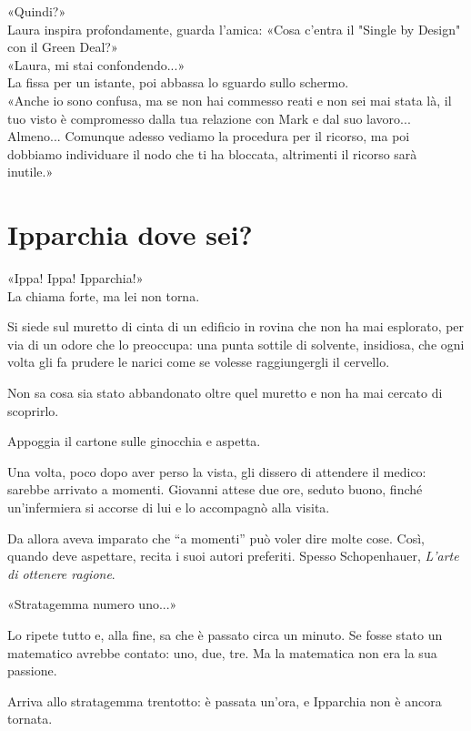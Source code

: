 \documentclass[10pt,oneside]{extbook}
\begin{document}
«Quindi?»\\
Laura inspira profondamente, guarda l'amica:
«Cosa c'entra il "Single by Design" con il Green Deal?»\\
«Laura, mi stai confondendo...»\\

La fissa per un istante, poi abbassa lo sguardo sullo schermo.\\

«Anche io sono confusa, ma se non hai commesso reati e non sei mai stata l\`a, il tuo visto \`e compromesso dalla tua relazione con Mark e dal suo lavoro... Almeno... Comunque adesso vediamo la procedura per il ricorso, ma poi dobbiamo individuare il nodo che ti ha bloccata, altrimenti il ricorso sarà inutile.»

\clearpage{}
\clearpage{}\chapter{Ipparchia dove sei?}

«Ippa! Ippa! Ipparchia!»\\
La chiama forte, ma lei non torna.

Si siede sul muretto di cinta di un edificio in rovina che non ha mai esplorato, per via di un odore che lo preoccupa: una punta sottile di solvente, insidiosa, che ogni volta gli fa prudere le narici come se volesse raggiungergli il cervello.

Non sa cosa sia stato abbandonato oltre quel muretto e non ha mai cercato di scoprirlo.

Appoggia il cartone sulle ginocchia e aspetta.

Una volta, poco dopo aver perso la vista, gli dissero di attendere il medico: sarebbe arrivato a momenti. Giovanni attese due ore, seduto buono, finch\'e un’infermiera si accorse di lui e lo accompagnò alla visita.

Da allora aveva imparato che “a momenti” pu\`o voler dire molte cose. Così, quando deve aspettare, recita i suoi autori preferiti. Spesso Schopenhauer, \textit{L’arte di ottenere ragione}.

«Stratagemma numero uno...»

Lo ripete tutto e, alla fine, sa che \`e passato circa un minuto. Se fosse stato un matematico avrebbe contato: uno, due, tre. Ma la matematica non era la sua passione.

Arriva allo stratagemma trentotto: \`e passata un’ora, e Ipparchia non \`e ancora tornata.
\end{document}
